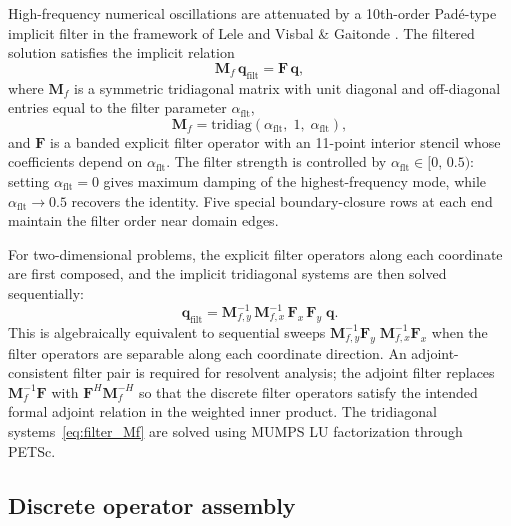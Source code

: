 \documentclass[11pt]{article}
\newcommand{\bq}{\mathbf{q}}
\newcommand{\bM}{\mathbf{M}}
\newcommand{\bF}{\mathbf{F}}
\begin{document}
High-frequency numerical oscillations are attenuated by a 10th-order Pad\'e-type implicit filter in the framework of Lele \cite{lele1992compact} and Visbal \& Gaitonde \cite{visbal2002use}.
The filtered solution satisfies the implicit relation
\begin{equation}
  \bM_f\,\bq_{\mathrm{filt}} = \bF\,\bq,
  \label{eq:filter_implicit}
\end{equation}
where $\bM_f$ is a symmetric tridiagonal matrix with unit diagonal and off-diagonal entries equal to the filter parameter $\alpha_\mathrm{flt}$,
\begin{equation}
  \bM_f = \mathrm{tridiag}(\alpha_\mathrm{flt},\;1,\;\alpha_\mathrm{flt}),
  \label{eq:filter_Mf}
\end{equation}
and $\bF$ is a banded explicit filter operator with an 11-point interior stencil whose coefficients depend on $\alpha_\mathrm{flt}$.
The filter strength is controlled by $\alpha_\mathrm{flt} \in [0,\,0.5)$: setting $\alpha_\mathrm{flt} = 0$ gives maximum damping of the highest-frequency mode, while $\alpha_\mathrm{flt} \to 0.5$ recovers the identity.
Five special boundary-closure rows at each end maintain the filter order near domain edges.

For two-dimensional problems, the explicit filter operators along each coordinate are first composed, and the implicit tridiagonal systems are then solved sequentially:
\begin{equation}
  \bq_{\mathrm{filt}} = \bM_{f,y}^{-1}\,\bM_{f,x}^{-1}\,\bF_x\,\bF_y\;\bq.
  \label{eq:filter_2d}
\end{equation}
This is algebraically equivalent to sequential sweeps $\bM_{f,y}^{-1}\bF_y\;\bM_{f,x}^{-1}\bF_x$ when the filter operators are separable along each coordinate direction.
An adjoint-consistent filter pair is required for resolvent analysis; the adjoint filter replaces
$\bM_f^{-1}\bF$ with $\bF^H\bM_f^{-H}$ so that the discrete filter operators satisfy the intended formal adjoint relation in the weighted inner product.
The tridiagonal systems~\eqref{eq:filter_Mf} are solved using MUMPS LU factorization through PETSc.

\subsection{Discrete operator assembly}
\label{sec:assembly}
\end{document}
